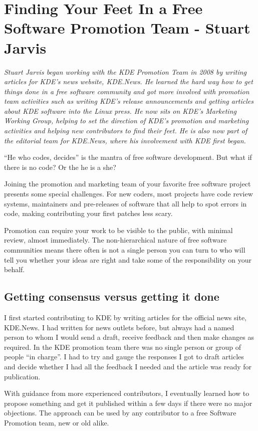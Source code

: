 \chapter{Finding Your Feet In a Free Software Promotion Team - Stuart Jarvis}
\textit{Stuart Jarvis began working with the KDE Promotion Team in 2008 by
writing articles for KDE's news website, KDE.News. He learned the hard way how
to get things done in a free software community and got more involved with
promotion team activities such as writing KDE's release announcements and
getting articles about KDE software into the Linux press. He now sits on KDE's
Marketing Working Group, helping to set the direction of KDE's promotion and
marketing activities and helping new contributors to find their feet. He is also
now part of the editorial team for KDE.News, where his involvement with KDE
first began.}

``He who codes, decides'' is the mantra of free software development. But what
if there is no code? Or the he is a she?

Joining the promotion and marketing team of your favorite free software project
presents some special challenges. For new coders, most projects have code review
systems, maintainers and pre-releases of software that all help to spot errors
in code, making contributing your first patches less scary. 

Promotion can require your work to be visible to the public, with minimal
review, almost immediately. The non-hierarchical nature of free software
communities means there often is not a single person you can turn to who will
tell you whether your ideas are right and take some of the responsibility on
your behalf.

\section*{Getting consensus versus getting it done}

I first started contributing to KDE by writing articles for the official news
site, KDE.News. I had written for news outlets before, but always had a named
person to whom I would send a draft, receive feedback and then make changes as
required. In the KDE promotion team there was no single person or group of
people ``in charge''. I had to try and gauge the responses I got to draft
articles and decide whether I had all the feedback I needed and the article was
ready for publication.

With guidance from more experienced contributors, I eventually learned how to
propose something and get it published within a few days if there were no major
objections. The approach can be used by any contributor to a free Software
Promotion team, new or old alike.

